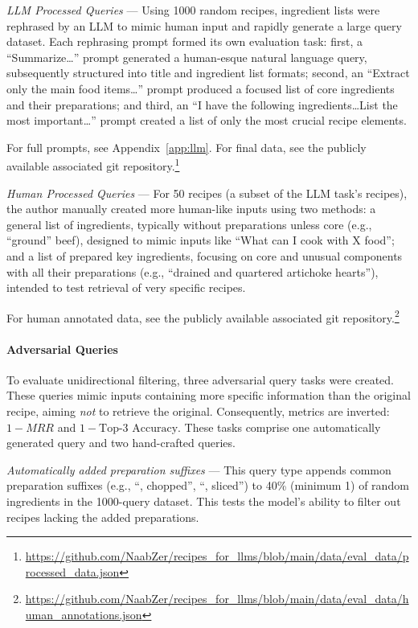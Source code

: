 \documentclass[11pt]{article}
\begin{document}
\emph{LLM Processed Queries} --- Using 1000 random recipes, ingredient lists
were rephrased by an LLM to mimic human input and rapidly generate a large query
dataset.
Each rephrasing prompt formed its own evaluation task: first, a
``Summarize\ldots'' prompt generated a human-esque natural language query,
subsequently structured into title and ingredient list formats; second, an
``Extract only the main food items\ldots'' prompt produced a focused list of
core ingredients and their preparations; and third, an ``I have the following
ingredients\ldots List the most important\ldots'' prompt created a list of only
the most crucial recipe elements.  

For full prompts, see Appendix~\ref{app:llm}. For final data, see the publicly
available associated git
repository.\footnote{\url{https://github.com/NaabZer/recipes_for_llms/blob/main/data/eval_data/processed_data.json}}

\emph{Human Processed Queries} --- For 50 recipes (a subset of the LLM task's
recipes), the author manually created more human-like inputs using two methods:
a general list of ingredients, typically without preparations unless core (e.g.,
``ground'' beef), designed to mimic inputs like ``What can I cook with X
food''; and a list of prepared key ingredients, focusing on core and unusual
components with all their preparations (e.g., ``drained and quartered artichoke
hearts''), intended to test retrieval of very specific recipes.

For human annotated data, see the publicly available associated git
repository.\footnote{\url{https://github.com/NaabZer/recipes_for_llms/blob/main/data/eval_data/human_annotations.json}} 

\paragraph{Adversarial Queries}
To evaluate unidirectional filtering, three adversarial query tasks were created.
These queries mimic inputs containing more specific information than the
original recipe, aiming \emph{not} to retrieve the original.
Consequently, metrics are inverted: $1-MRR$ and $1-\text{Top-3 Accuracy}$.
These tasks comprise one automatically generated query and two hand-crafted queries.

\emph{Automatically added preparation suffixes} --- This query type appends
common preparation suffixes (e.g., ``, chopped'', ``, sliced'') to 40\% (minimum
1) of random ingredients in the 1000-query dataset.
This tests the model's ability to filter out recipes lacking the added preparations.
\end{document}
